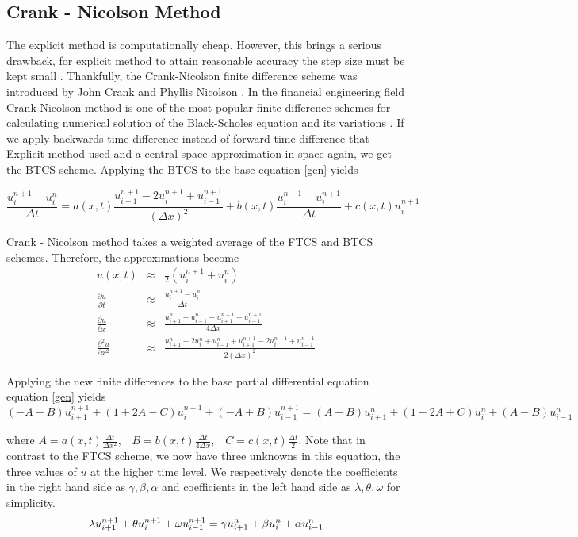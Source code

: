 \documentclass[12pt, oneside]{book}
\theoremstyle{plain}
\theoremstyle{definition}
\begin{document}
\subsection{Crank - Nicolson Method}
The explicit method is computationally cheap. However, this brings a serious drawback, for explicit method to attain reasonable accuracy the step size must be kept small \cite{gdsmith}. Thankfully, the Crank-Nicolson finite difference scheme was introduced by John Crank and Phyllis Nicolson \cite{cn}. In the financial engineering field Crank-Nicolson method is one of the most popular finite difference schemes for calculating numerical solution of the Black-Scholes equation and its variations \cite{tavella}. If we apply backwards time difference instead of forward time difference that Explicit method used and a central space approximation in space again, we get the BTCS scheme. Applying the BTCS to the base equation \ref{gen} yields

\begin{equation}
\frac{u^{n+1}_i - u^n_i}{\Delta t}  = a(x, t)  \frac{u^{n+1}_{i+1}- 2u^{n+1}_i + u^{n+1}_{i-1}}{(\Delta x)^2}  + b(x, t)  \frac{u^{n+1}_i - u^{n+1}_i}{\Delta t}  + c(x, t)  u^{n+1}_i
\end{equation}

Crank - Nicolson method takes a weighted average of the FTCS and BTCS schemes. Therefore, the approximations become
\begin{eqnarray}
u(x, t) &\approx& \frac{1}{2} ( u^{n+1}_i +  u^n_i)\\
\frac{\partial u}{\partial t} &\approx & \frac{u^{n+1}_i - u^n_i}{\Delta t}\\
\frac{\partial u}{\partial x} &\approx & \frac{u^n_{i+1} - u^n_{i-1} + u^{n+1}_{i+1} - u^{n+1}_{i-1}}{4\Delta x} \\ 
\frac{\partial^2 u}{\partial x^2} &\approx & \frac{u^n_{i+1}- 2u^n_i + u^n_{i-1} + u^{n+1}_{i+1}- 2u^{n+1}_i + u^{n+1}_{i-1}}{2(\Delta x)^2}
\end{eqnarray}

Applying the new finite differences to the base partial differential equation equation \ref{gen} yields
\begin{equation}
(-A -B) u^{n+1}_{i+1} + (1 + 2A - C) u^{n+1}_i + (-A + B) u^{n+1}_{i-1} = (A + B) u^{n}_{i+1} + (1 - 2A + C) u^{n}_i + (A - B) u^{n}_{i-1}
\end{equation}

where $ A = a(x, t) \frac{\Delta t}{\Delta x^2}, \hspace{10pt}  B = b(x, t) \frac{\Delta t}{4\Delta x}, \hspace{10pt} C = c(x, t) \frac{\Delta t}{2}$. Note that in contrast to the FTCS scheme, we now have three unknowns in this equation, the three values of $u$ at the higher time level.  We respectively denote the coefficients in the right hand side as $\gamma, \beta, \alpha$ and coefficients in the left hand side as $\lambda, \theta, \omega$ for simplicity.
\begin{equation}
\lambda u^{n+1}_{i+1} + \theta u^{n+1}_i + \omega u^{n+1}_{i-1} \\
=  \gamma u^{n}_{i+1} + \beta u^{n}_i + \alpha u^{n}_{i-1}
\end{equation}
\end{document}
